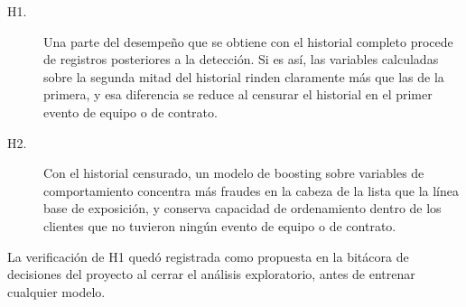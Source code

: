\begin{description}
  \item[H1.] Una parte del desempeño que se obtiene con el historial completo procede de
    registros posteriores a la detección. Si es así, las variables calculadas sobre la
    segunda mitad del historial rinden claramente más que las de la primera, y esa
    diferencia se reduce al censurar el historial en el primer evento de equipo o de
    contrato.
  \item[H2.] Con el historial censurado, un modelo de boosting sobre variables de
    comportamiento concentra más fraudes en la cabeza de la lista que la línea base de
    exposición, y conserva capacidad de ordenamiento dentro de los clientes que no tuvieron
    ningún evento de equipo o de contrato.
\end{description}

La verificación de H1 quedó registrada como propuesta en la bitácora de decisiones del
proyecto al cerrar el análisis exploratorio, antes de entrenar cualquier modelo.
